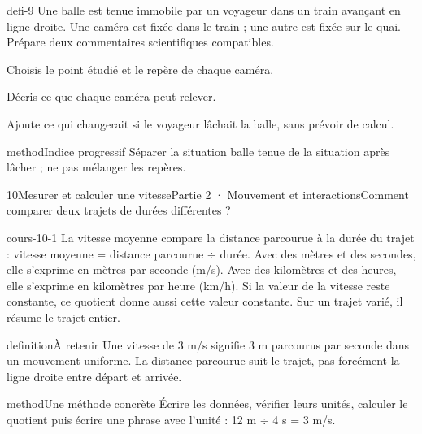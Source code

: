 \documentclass[12pt,twoside,openany]{book}
\begin{document}
\label{defi-ex-9}
\begin{pcFiche}{defi-9}
Une balle est tenue immobile par un voyageur dans un train avançant en ligne droite. Une caméra est fixée dans le train ; une autre est fixée sur le quai. Prépare deux commentaires scientifiques compatibles.\par
{}
\begin{questions}
\item Choisis le point étudié et le repère de chaque caméra.
\item Décris ce que chaque caméra peut relever.
\item Ajoute ce qui changerait si le voyageur lâchait la balle, sans prévoir de calcul.
\end{questions}
\begin{pcEncadre}{method}{Indice progressif}
Séparer la situation balle tenue de la situation après lâcher ; ne pas mélanger les repères.\par
\end{pcEncadre}
\end{pcFiche}
\clearpage\pagestyle{otMain}
\begin{ouverture}[college2]{10}{Mesurer et calculer une vitesse}{Partie 2 · Mouvement et interactions}{Comment comparer deux trajets de durées différentes ?}
\end{ouverture}
\label{ch-10-cours-1}
\label{ess-10}
\begin{pcFiche}{cours-10-1}
La vitesse moyenne compare la distance parcourue à la durée du trajet : vitesse moyenne = distance parcourue \(\div\) durée. Avec des mètres et des secondes, elle s’exprime en mètres par seconde (m/s). Avec des kilomètres et des heures, elle s’exprime en kilomètres par heure (km/h). Si la valeur de la vitesse reste constante, ce quotient donne aussi cette valeur constante. Sur un trajet varié, il résume le trajet entier.\par
{}
\begin{pcEncadre}{definition}{À retenir}
Une vitesse de 3 m/s signifie 3 m parcourus par seconde dans un mouvement uniforme. La distance parcourue suit le trajet, pas forcément la ligne droite entre départ et arrivée.\par
\end{pcEncadre}
\begin{pcEncadre}{method}{Une méthode concrète}
Écrire les données, vérifier leurs unités, calculer le quotient puis écrire une phrase avec l’unité : 12 m \(\div\) 4 s = 3 m/s.\par
\end{pcEncadre}
\end{pcFiche}
\end{document}
